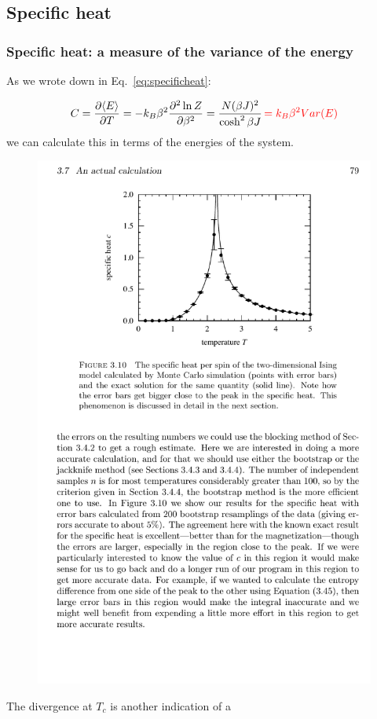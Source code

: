 \documentclass[hyperref={colorlinks=true}]{beamer}
\begin{document}
\begin{frame}
\end{frame}


\subsection[Specific heat]{Specific heat}


\begin{frame}%
  \frametitle{Specific heat: a measure of the variance of the energy}
 
  As we wrote down in Eq.~\ref{eq:specificheat}:
  
  \begin{equation}
    C = \frac{\partial \langle E \rangle}{\partial T} = -k_B \beta^2 \frac{\partial^2 \ln Z}{\partial \beta^2} = \frac{N (\beta J)^2}{\cosh^2 \beta J}  \textcolor{red}{\, = k_B \beta^2 Var(E) }   
  \end{equation}
  we can calculate this in terms of the energies of the system.
  \begin{figure}
    \includegraphics[width=0.6\columnwidth]{2DIsing-Simulation-SpecificHeat.pdf}
  \end{figure}
  \vspace{-0.2cm}
  \begin{ucblock}{}
    \centering The divergence at $T_c$ is another indication of a 
  \end{ucblock}
  
\end{frame}
\end{document}
